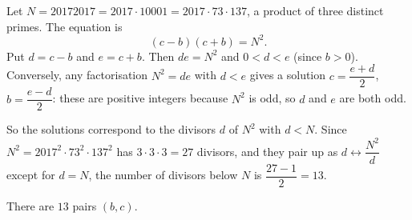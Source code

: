 Let $N=20172017=2017\cdot10001=2017\cdot73\cdot137$, a product of three distinct primes. The equation is
\[
(c-b)(c+b)=N^2 .
\]
Put $d=c-b$ and $e=c+b$. Then $de=N^2$ and $0<d<e$ (since $b>0$). Conversely, any factorisation $N^2=de$ with $d<e$ gives a solution $c=\dfrac{e+d}{2}$, $b=\dfrac{e-d}{2}$: these are positive integers because $N^2$ is odd, so $d$ and $e$ are both odd.

So the solutions correspond to the divisors $d$ of $N^2$ with $d<N$. Since $N^2=2017^2\cdot73^2\cdot137^2$ has $3\cdot3\cdot3=27$ divisors, and they pair up as $d\leftrightarrow\dfrac{N^2}{d}$ except for $d=N$, the number of divisors below $N$ is $\dfrac{27-1}{2}=13$.

There are $\boxed{13}$ pairs $(b,c)$.
